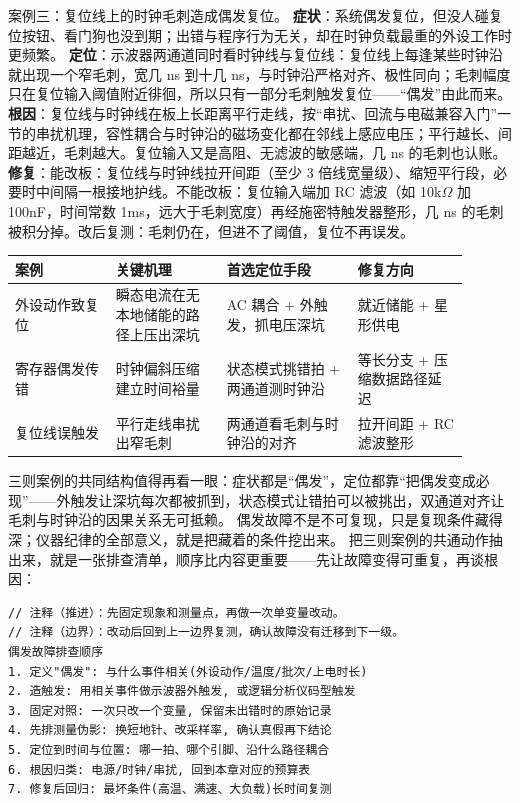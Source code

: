 案例三：复位线上的时钟毛刺造成偶发复位。
\textbf{症状}：系统偶发复位，但没人碰复位按钮、看门狗也没到期；出错与程序行为无关，却在时钟负载最重的外设工作时更频繁。
\textbf{定位}：示波器两通道同时看时钟线与复位线：复位线上每逢某些时钟沿就出现一个窄毛刺，宽几 ns 到十几 ns，与时钟沿严格对齐、极性同向；毛刺幅度只在复位输入阈值附近徘徊，所以只有一部分毛刺触发复位——“偶发”由此而来。
\textbf{根因}：复位线与时钟线在板上长距离平行走线，按“串扰、回流与电磁兼容入门”一节的串扰机理，容性耦合与时钟沿的磁场变化都在邻线上感应电压；平行越长、间距越近，毛刺越大。复位输入又是高阻、无滤波的敏感端，几 ns 的毛刺也认账。
\textbf{修复}：能改板：复位线与时钟线拉开间距（至少 3 倍线宽量级）、缩短平行段，必要时中间隔一根接地护线。不能改板：复位输入端加 RC 滤波（如 10k$\Omega$ 加 100nF，时间常数 1ms，远大于毛刺宽度）再经施密特触发器整形，几 ns 的毛刺被积分掉。改后复测：毛刺仍在，但进不了阈值，复位不再误发。

\begin{longtable}{L{0.20\linewidth}L{0.22\linewidth}L{0.26\linewidth}L{0.22\linewidth}}
\toprule
案例 & 关键机理 & 首选定位手段 & 修复方向 \\
\midrule
外设动作致复位 & 瞬态电流在无本地储能的路径上压出深坑 & AC 耦合 + 外触发，抓电压深坑 & 就近储能 + 星形供电 \\\tablerowrule
寄存器偶发传错 & 时钟偏斜压缩建立时间裕量 & 状态模式挑错拍 + 两通道测时钟沿 & 等长分支 + 压缩数据路径延迟 \\\tablerowrule
复位线误触发 & 平行走线串扰出窄毛刺 & 两通道看毛刺与时钟沿的对齐 & 拉开间距 + RC 滤波整形 \\
\bottomrule
\end{longtable}

三则案例的共同结构值得再看一眼：症状都是“偶发”，定位都靠“把偶发变成必现”——外触发让深坑每次都被抓到，状态模式让错拍可以被挑出，双通道对齐让毛刺与时钟沿的因果关系无可抵赖。
偶发故障不是不可复现，只是复现条件藏得深；仪器纪律的全部意义，就是把藏着的条件挖出来。
把三则案例的共通动作抽出来，就是一张排查清单，顺序比内容更重要——先让故障变得可重复，再谈根因：

\begin{lstlisting}
// 注释（推进）：先固定现象和测量点，再做一次单变量改动。
// 注释（边界）：改动后回到上一边界复测，确认故障没有迁移到下一级。
偶发故障排查顺序
1. 定义"偶发": 与什么事件相关(外设动作/温度/批次/上电时长)
2. 造触发: 用相关事件做示波器外触发, 或逻辑分析仪码型触发
3. 固定对照: 一次只改一个变量, 保留未出错时的原始记录
4. 先排测量伪影: 换短地针、改采样率, 确认真假再下结论
5. 定位到时间与位置: 哪一拍、哪个引脚、沿什么路径耦合
6. 根因归类: 电源/时钟/串扰, 回到本章对应的预算表
7. 修复后回归: 最坏条件(高温、满速、大负载)长时间复测
\end{lstlisting}

